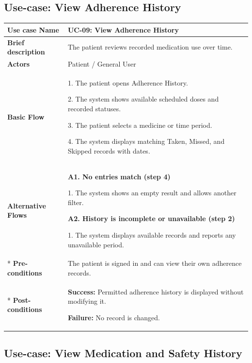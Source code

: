 \clearpage
\subsection{Use-case: View Adherence History}
\label{uc:uc-09}

\begin{longtable}{|p{}|p{}|}
\hline
\textbf{Use case Name} & UC-09: View Adherence History \\ \hline
\textbf{Brief description} & The patient reviews recorded medication use over time. \\ \hline
\textbf{Actors} & Patient / General User \\ \hline
\textbf{Basic Flow} &
1. The patient opens Adherence History.\par
2. The system shows available scheduled doses and recorded statuses.\par
3. The patient selects a medicine or time period.\par
4. The system displays matching Taken, Missed, and Skipped records with dates.
\\ \hline
\textbf{Alternative Flows} &
\textbf{A1. No entries match (step 4)}\par
1. The system shows an empty result and allows another filter.
\par
\textbf{A2. History is incomplete or unavailable (step 2)}\par
1. The system displays available records and reports any unavailable period.
\\* \hline
\textbf{Pre-conditions} & The patient is signed in and can view their own adherence records. \\* \hline
\textbf{Post-conditions} & \textbf{Success:} Permitted adherence history is displayed without modifying it.\par
\textbf{Failure:} No record is changed. \\ \hline
\end{longtable}


\clearpage
\subsection{Use-case: View Medication and Safety History}
\label{uc:uc-10}

